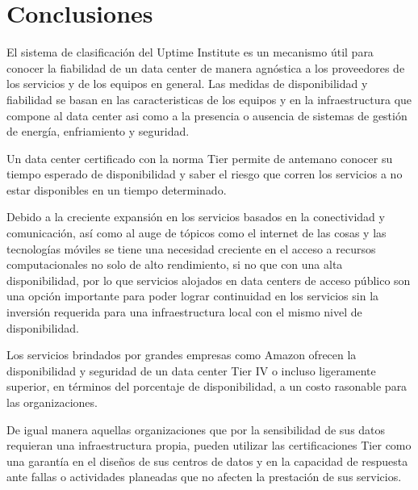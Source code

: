 \documentclass[journal]{IEEEtran}
\begin{document}
\section{Conclusiones}
El sistema de clasificación del Uptime Institute es un mecanismo útil para conocer la fiabilidad de un data center de manera agnóstica a
los proveedores de los servicios y de los equipos en general.
Las medidas de disponibilidad y fiabilidad se basan en las caracteristicas de los equipos y en la infraestructura que compone al data center asi como a la presencia o ausencia
de sistemas de gestión de energía, enfriamiento y seguridad.

Un data center certificado con la norma Tier permite de antemano conocer su tiempo esperado de disponibilidad y saber el riesgo que corren los servicios a no estar disponibles 
en un tiempo determinado.

Debido a la creciente expansión en los servicios basados en la conectividad y comunicación, así como al auge de tópicos como el internet de las cosas y las tecnologías móviles 
se tiene una necesidad creciente en el acceso a recursos computacionales no solo de alto rendimiento, si no que con una alta disponibilidad, por lo que servicios alojados en data centers
de acceso público son una opción importante para poder lograr continuidad en los servicios sin la inversión requerida para una infraestructura local con el mismo nivel de disponibilidad.

Los servicios brindados por grandes empresas como Amazon ofrecen la disponibilidad y seguridad de un data center Tier IV o incluso ligeramente superior, en términos del porcentaje de disponibilidad, a un 
costo rasonable para las organizaciones.

De igual manera aquellas organizaciones que por la sensibilidad de sus datos requieran una infraestructura propia, pueden utilizar las certificaciones Tier como una garantía en el diseños
de sus centros de datos y en la capacidad de respuesta ante fallas o actividades planeadas que no afecten la prestación de sus servicios.







\end{document}
